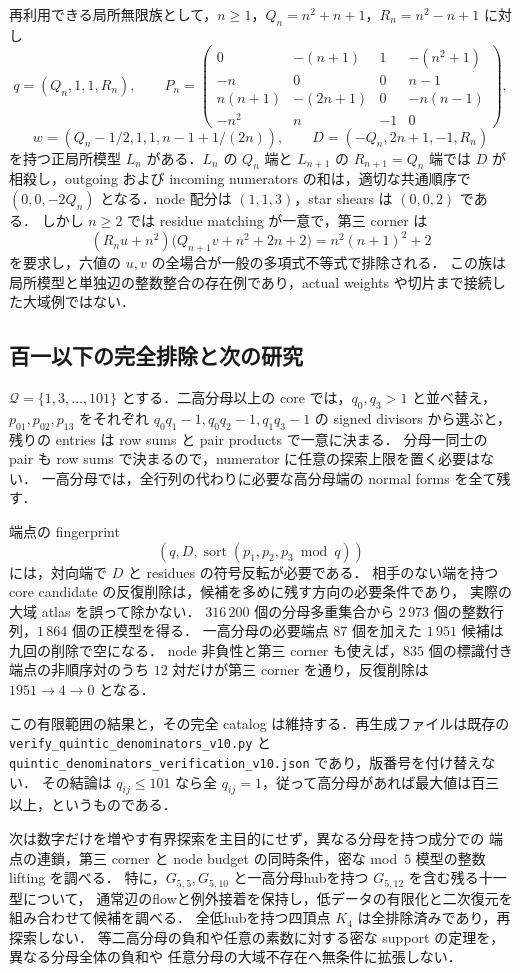 再利用できる局所無限族として，$n\geq1$，$Q_n=n^2+n+1$，$R_n=n^2-n+1$ に対し
\[
 q=(Q_n,1,1,R_n),\qquad
 P_n=\begin{pmatrix}
 0&-(n+1)&1&-(n^2+1)\\
 -n&0&0&n-1\\
 n(n+1)&-(2n+1)&0&-n(n-1)\\
 -n^2&n&-1&0
 \end{pmatrix},
\]
\[
 w=(Q_n-1/2,1,1,n-1+1/(2n)),\qquad
 D=(-Q_n,2n+1,-1,R_n)
\]
を持つ正局所模型 $L_n$ がある．$L_n$ の $Q_n$ 端と $L_{n+1}$ の $R_{n+1}=Q_n$ 端では
$D$ が相殺し，outgoing および incoming numerators の和は，適切な共通順序で
$(0,0,-2Q_n)$ となる．node 配分は $(1,1,3)$，star shears は $(0,0,2)$ である．
しかし $n\geq2$ では residue matching が一意で，第三 corner は
\[
 (R_nu+n^2)\bigl(Q_{n+1}v+n^2+2n+2\bigr)
   =n^2(n+1)^2+2
\]
を要求し，六値の $u,v$ の全場合が一般の多項式不等式で排除される．
この族は局所模型と単独辺の整数整合の存在例であり，actual weights や切片まで接続した大域例ではない．

\subsection{百一以下の完全排除と次の研究}

$\mathcal Q=\{1,3,\ldots,101\}$ とする．二高分母以上の core では，$q_0,q_3>1$ と並べ替え，
$p_{01},p_{02},p_{13}$ をそれぞれ $q_0q_1-1,q_0q_2-1,q_1q_3-1$ の signed divisors から選ぶと，
残りの entries は row sums と pair products で一意に決まる．
分母一同士の pair も row sums で決まるので，numerator に任意の探索上限を置く必要はない．
一高分母では，全行列の代わりに必要な高分母端の normal forms を全て残す．

端点の fingerprint
\[
 \left(q,D,\operatorname{sort}(p_1,p_2,p_3\bmod q)\right)
\]
には，対向端で $D$ と residues の符号反転が必要である．
相手のない端を持つ core candidate の反復削除は，候補を多めに残す方向の必要条件であり，
実際の大域 atlas を誤って除かない．
$316\,200$ 個の分母多重集合から $2\,973$ 個の整数行列，$1\,864$ 個の正模型を得る．
一高分母の必要端点 $87$ 個を加えた $1\,951$ 候補は九回の削除で空になる．
node 非負性と第三 corner も使えば，$835$ 個の標識付き端点の非順序対のうち
$12$ 対だけが第三 corner を通り，反復削除は $1951\to4\to0$ となる．

この有限範囲の結果と，その完全 catalog は維持する．再生成ファイルは既存の
\nolinkurl{verify_quintic_denominators_v10.py} と
\nolinkurl{quintic_denominators_verification_v10.json} であり，版番号を付け替えない．
その結論は $q_{ij}\leq101$ なら全 $q_{ij}=1$，従って高分母があれば最大値は百三以上，というものである．

次は数字だけを増やす有界探索を主目的にせず，異なる分母を持つ成分での
端点の連鎖，第三 corner と node budget の同時条件，密な mod~$5$ 模型の整数 lifting を調べる．
特に，$G_{5,5},G_{5,10}$ と一高分母hubを持つ $G_{5,12}$ を含む残る十一型について，
通常辺のflowと例外接着を保持し，低データの有限化と二次復元を組み合わせて候補を調べる．
全低hubを持つ四頂点 $K_4$ は全排除済みであり，再探索しない．
等二高分母の負和や任意の素数に対する密な support の定理を，異なる分母全体の負和や
任意分母の大域不存在へ無条件に拡張しない．
